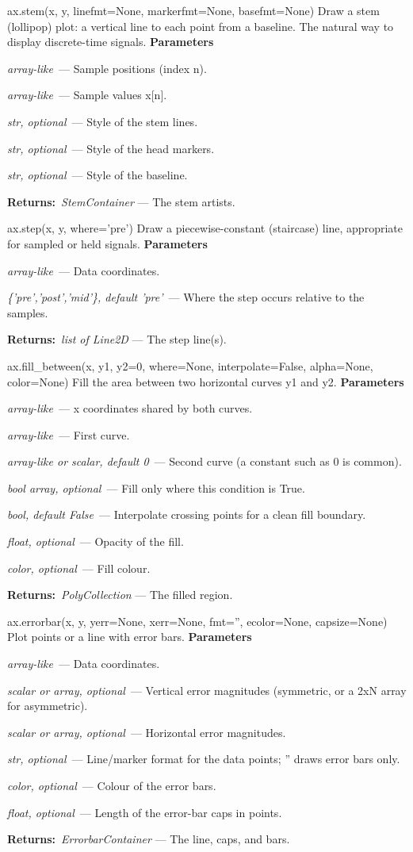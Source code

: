 \documentclass[10pt]{article}
\newenvironment{params}
  {\smallskip\textbf{\small\color{accent}Parameters}\par\nopagebreak
   \begin{description}[leftmargin=1.3em,itemsep=1.5pt,parsep=0pt,topsep=1pt,
      labelindent=0pt,style=sameline,font=\normalfont]}
  {\end{description}}
\newcommand{\pitem}[3]{\item[{\ttfamily\color{accent}#1}]{\itshape #2}\ --- #3}
\newcommand{\preturn}[2]{\smallskip\textbf{\small\color{accent}Returns:}\ {\itshape #1} --- #2\par}
\begin{document}
\begin{func}{ax.stem(x, y, linefmt=None, markerfmt=None, basefmt=None)}
Draw a stem (lollipop) plot: a vertical line to each point from a baseline. The natural way to display discrete-time signals.
\begin{params}
\pitem{x}{array-like}{Sample positions (index n).}
\pitem{y}{array-like}{Sample values x[n].}
\pitem{linefmt}{str, optional}{Style of the stem lines.}
\pitem{markerfmt}{str, optional}{Style of the head markers.}
\pitem{basefmt}{str, optional}{Style of the baseline.}
\end{params}
\preturn{StemContainer}{The stem artists.}
\end{func}
\medskip

\begin{func}{ax.step(x, y, where='pre')}
Draw a piecewise-constant (staircase) line, appropriate for sampled or held signals.
\begin{params}
\pitem{x, y}{array-like}{Data coordinates.}
\pitem{where}{\{'pre','post','mid'\}, default 'pre'}{Where the step occurs relative to the samples.}
\end{params}
\preturn{list of Line2D}{The step line(s).}
\end{func}
\medskip

\begin{func}{ax.fill\_between(x, y1, y2=0, where=None, interpolate=False, alpha=None, color=None)}
Fill the area between two horizontal curves y1 and y2.
\begin{params}
\pitem{x}{array-like}{x coordinates shared by both curves.}
\pitem{y1}{array-like}{First curve.}
\pitem{y2}{array-like or scalar, default 0}{Second curve (a constant such as 0 is common).}
\pitem{where}{bool array, optional}{Fill only where this condition is True.}
\pitem{interpolate}{bool, default False}{Interpolate crossing points for a clean fill boundary.}
\pitem{alpha}{float, optional}{Opacity of the fill.}
\pitem{color}{color, optional}{Fill colour.}
\end{params}
\preturn{PolyCollection}{The filled region.}
\end{func}
\medskip

\begin{func}{ax.errorbar(x, y, yerr=None, xerr=None, fmt='', ecolor=None, capsize=None)}
Plot points or a line with error bars.
\begin{params}
\pitem{x, y}{array-like}{Data coordinates.}
\pitem{yerr}{scalar or array, optional}{Vertical error magnitudes (symmetric, or a 2xN array for asymmetric).}
\pitem{xerr}{scalar or array, optional}{Horizontal error magnitudes.}
\pitem{fmt}{str, optional}{Line/marker format for the data points; '' draws error bars only.}
\pitem{ecolor}{color, optional}{Colour of the error bars.}
\pitem{capsize}{float, optional}{Length of the error-bar caps in points.}
\end{params}
\preturn{ErrorbarContainer}{The line, caps, and bars.}
\end{func}
\medskip
\end{document}
